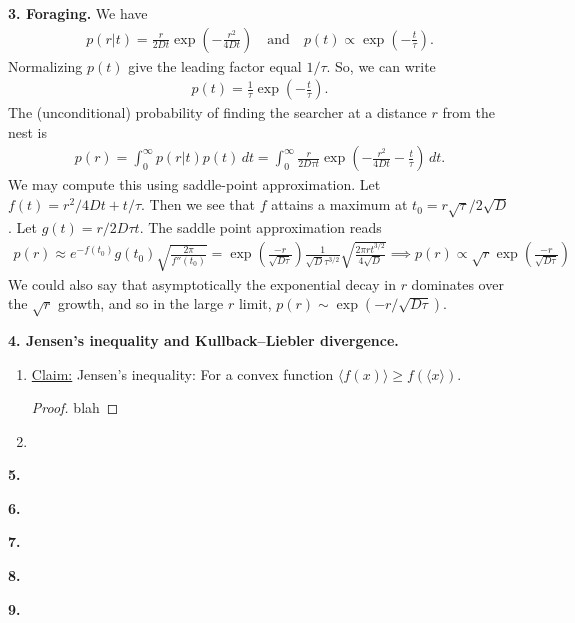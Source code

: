 \documentclass{article}
\theoremstyle{definition}
\newcommand{\f}[2]{\frac{#1}{#2}}
\newcommand{\lp}{\left(}
\newcommand{\rp}{\right)}
\begin{document}
\noindent \textbf{3. Foraging.} We have 
\begin{align*}
p(r|t) = \f{r}{2Dt} \exp\lp -\f{r^2}{4Dt} \rp\quad
\text{and}\quad
p(t) \propto \exp\lp- \f{t}{\tau} \rp.
\end{align*}
Normalizing $p(t)$ give the leading factor equal $1/\tau$. So, we can write
\begin{align*}
p(t) = \f{1}{\tau} \exp\lp - \f{t}{\tau} \rp.
\end{align*}
The (unconditional) probability of finding the searcher at a distance $r$ from the nest is 
\begin{align*}
p(r) = \int_0^\infty p(r|t)p(t)\,dt = \int_0^\infty \f{r}{2D\tau t} \exp\lp -\f{r^2}{4Dt} - \f{t}{\tau} \rp\,dt.
\end{align*}
We may compute this using saddle-point approximation. Let $f(t)= r^2/4Dt + t/\tau$. Then we see that $f$ attains a maximum at $t_0 = r\sqrt{\tau}/2\sqrt{D}$. Let $g(t) = r/2D\tau t$. The saddle point approximation reads
\begin{align*}
p(r)\approx e^{-f(t_0)} g(t_0)\sqrt{\f{2\pi}{f''(t_0)}} = \exp\lp \f{-r}{\sqrt{D\tau}} \rp \f{1}{\sqrt{D}\tau^{3/2}} \sqrt{\f{2\pi r t^{3/2}}{4\sqrt{D}}} \implies
\boxed{p(r) \propto \sqrt{r}\exp\lp \f{-r}{\sqrt{D\tau}} \rp}
\end{align*}
We could also say that asymptotically the exponential decay in $r$ dominates over the $\sqrt{r}$ growth, and so in the large $r$ limit, $p(r)\sim \exp(-r/\sqrt{D\tau})$.



\newpage





\noindent \textbf{4. Jensen's inequality and Kullback–Liebler divergence. }

\begin{enumerate}[label=(\alph*)]
	\item \underline{Claim:} Jensen's inequality: For a convex function $\langle f(x) \rangle \geq f(\langle x \rangle)$.
	\begin{proof}
		blah
	\end{proof}
	
	
	\item 
\end{enumerate}


\noindent \textbf{5. }


\noindent \textbf{6. }


\noindent \textbf{7. }


\noindent \textbf{8. }


\noindent \textbf{9. }

 
\end{document}
